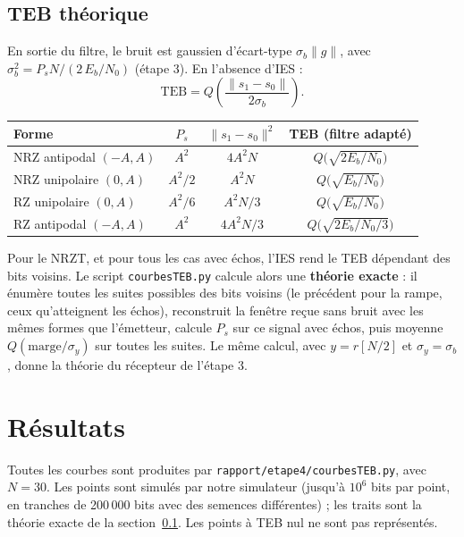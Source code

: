 \documentclass[11pt,a4paper]{article}
\newcommand{\EbNo}{E_b/N_0}
\begin{document}
\subsection{TEB théorique}\label{sec:theorie}
En sortie du filtre, le bruit est gaussien d'écart-type $\sigma_b\|g\|$, avec $\sigma_b^2 = P_s N / (2\,\EbNo)$ (étape 3). En l'absence d'IES :
\[ \text{TEB} = Q\!\left(\frac{\|s_1 - s_0\|}{2\sigma_b}\right). \]
\begin{center}\begin{tabular}{lccc}\toprule
Forme & $P_s$ & $\|s_1 - s_0\|^2$ & TEB (filtre adapté)\\\midrule
NRZ antipodal $(-A, A)$ & $A^2$ & $4A^2N$ & $Q\big(\sqrt{2\EbNo}\big)$\\
NRZ unipolaire $(0, A)$ & $A^2/2$ & $A^2N$ & $Q\big(\sqrt{\EbNo}\big)$\\
RZ unipolaire $(0, A)$ & $A^2/6$ & $A^2N/3$ & $Q\big(\sqrt{\EbNo}\big)$\\
RZ antipodal $(-A, A)$ & $A^2$ & $4A^2N/3$ & $Q\big(\sqrt{2\EbNo/3}\big)$\\\bottomrule
\end{tabular}\end{center}
Pour le NRZT, et pour tous les cas avec échos, l'IES rend le TEB dépendant des bits voisins. Le script \texttt{courbesTEB.py} calcule alors une \textbf{théorie exacte} : il énumère toutes les suites possibles des bits voisins (le précédent pour la rampe, ceux qu'atteignent les échos), reconstruit la fenêtre reçue sans bruit avec les mêmes formes que l'émetteur, calcule $P_s$ sur ce signal avec échos, puis moyenne $Q(\text{marge}/\sigma_y)$ sur toutes les suites. Le même calcul, avec $y = r[N/2]$ et $\sigma_y = \sigma_b$, donne la théorie du récepteur de l'étape 3.

\section{Résultats}
Toutes les courbes sont produites par \texttt{rapport/etape4/courbesTEB.py}, avec $N = 30$. Les points sont simulés par notre simulateur (jusqu'à $10^6$ bits par point, en tranches de 200\,000 bits avec des semences différentes) ; les traits sont la théorie exacte de la section~\ref{sec:theorie}. Les points à TEB nul ne sont pas représentés.
\end{document}
